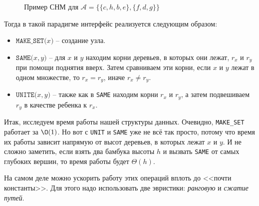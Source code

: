 \begin{figure}[H]
    \centering
    \caption{Пример СНМ для $\mathcal{A} = \{ \{c, h, b, e\}, \{f, d, g\}\}$}
\end{figure}

Тогда в такой парадигме интерфейс реализуется следующим образом:
\begin{itemize}
    \item $\texttt{MAKE\_SET(}x\texttt{)}$ -- создание узла.
    \item $\texttt{SAME(}x, y\texttt{)}$ -- для $x$ и $y$ находим корни деревьев, в которых они лежат, $r_x$ и $r_y$ при помощи поднятия вверх. Затем сравниваем эти корни, если $x$ и $y$ лежат в одном множестве, то $r_x = r_y$, иначе $r_x \neq r_y$.
    \item $\texttt{UNITE(}x, y\texttt{)}$ -- также как в \texttt{SAME} находим корни $r_x$ и $r_y$, а затем подвешиваем $r_y$ в качестве ребенка к $r_x$.
\end{itemize}

Итак, исследуем время работы нашей структуры данных. Очевидно, \texttt{MAKE\_SET} работает за $\O(1)$.
Но вот с \texttt{UNIT} и \texttt{SAME} уже не всё так просто, потому что время их работы зависит напрямую от высот деревьев, в которых лежат $x$ и $y$.
И не сложно заметить, если взять два бамбука высоты $h$ и вызвать \texttt{SAME} от самых глубоких вершин, то время работы будет $\Theta(h)$.

На самом деле можно ускорить работу этих операций вплоть до <<почти константы>>. Для этого надо использовать две эвристики: \textit{ранговую} и \textit{сжатие путей}.

